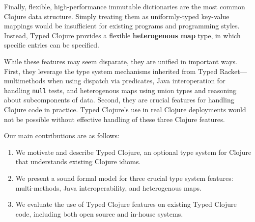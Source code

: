 Finally, flexible, high-performance immutable dictionaries
are the most common Clojure data structure.
Simply treating them as uniformly-typed
key-value mappings would be insufficient for existing
programs and programming styles. Instead, Typed Clojure provides a
flexible \textbf{heterogenous map} type, in which specific entries can be specified. 

While these features may seem disparate, they are unified in important
ways. First, they leverage the type system mechanisms
inherited from Typed Racket---multimethods when using 
dispatch via predicates, Java interoperation for handling
\texttt{null} tests, and heterogenous maps using union types and
reasoning about subcomponents of data. Second,
they are crucial features for handling Clojure code in
practice. Typed Clojure's use in real Clojure deployments would not be
possible without effective handling of these three Clojure features. 


Our main contributions are as follows:

\begin{enumerate}
  \item We motivate and describe  Typed Clojure, an optional
    type system for Clojure that understands existing Clojure idioms.
  \item We present a sound formal model for three crucial type
    system features: multi-methods, Java
    interoperability, and heterogenous maps.
  \item We evaluate the use of Typed Clojure features on existing
    Typed Clojure code, including both open source and in-house systems.
\end{enumerate}





